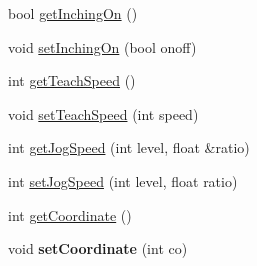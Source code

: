 \begin{DoxyCompactItemize}
bool \hyperlink{classCUIApp_a0e1919fc8bffe64510862903d2997746}{get\-Inching\-On} ()
\item 
void \hyperlink{classCUIApp_a875b8e4442379f90ce94c841bfb275ee}{set\-Inching\-On} (bool onoff)
\item 
int \hyperlink{classCUIApp_aed3628c3a5b2a214d95b66c158261469}{get\-Teach\-Speed} ()
\item 
void \hyperlink{classCUIApp_a48f2c72b1eedf48487c308c565102b04}{set\-Teach\-Speed} (int speed)
\item 
int \hyperlink{classCUIApp_a5a1b0c3f5b9ba0160e7fd04ce9045ad5}{get\-Jog\-Speed} (int level, float \&ratio)
\item 
int \hyperlink{classCUIApp_a7df9ad69084f03b2e610d0bc35769320}{set\-Jog\-Speed} (int level, float ratio)
\item 
int \hyperlink{classCUIApp_aa4adccaece246aa22b93d16219755521}{get\-Coordinate} ()
\item 
\hypertarget{classCUIApp_a20ea8f0c390d9ef552a006f153f4fbdf}{void {\bfseries set\-Coordinate} (int co)}\label{classCUIApp_a20ea8f0c390d9ef552a006f153f4fbdf}


\end{DoxyCompactItemize}
